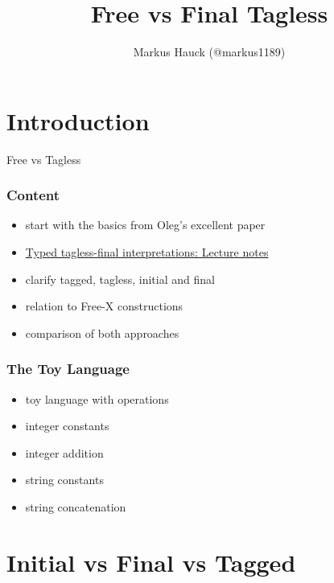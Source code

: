 \documentclass[aspectratio=169, hyperref={colorlinks, linkcolor=beamer@centricgreen}, urlcolor=links]{beamer}
\title{Free vs Final Tagless}
\author{Markus Hauck (@markus1189)}
\begin{document}
\begin{frame}
  \titlepage{}
\end{frame}

\section{Introduction}\label{sec:introduction}

\begin{frame}
  \begin{center}
    {\Huge Free vs Tagless}
  \end{center}
\end{frame}

\begin{frame}[fragile]
  \frametitle{Content}
  \begin{itemize}
  \item start with the basics from Oleg's excellent paper
  \item \href{http://okmij.org/ftp/tagless-final/course/index.html}{Typed tagless-final interpretations: Lecture notes}
  \item clarify tagged, tagless, initial and final
  \item relation to Free-X constructions
  \item comparison of both approaches
  \end{itemize}
\end{frame}

\begin{frame}
  \frametitle{The Toy Language}
  \begin{itemize}
  \item toy language with operations
  \item integer constants
  \item integer addition
  \item string constants
  \item string concatenation
  \end{itemize}
\end{frame}

\section{Initial vs Final vs Tagged}\label{sec:initial-final-tagged}
\end{document}
